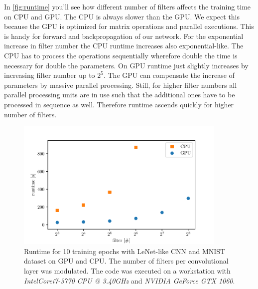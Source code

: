 \documentclass[a4paper,14pt]{article}
\begin{document}
In \autoref{fig:runtime} you'll see how different number of filters affects the
training time on CPU and GPU.
The CPU is always slower than the GPU.
We expect this because the GPU is optimized for matrix operations and parallel
executions. This is handy for forward and backpropagation of our network.
For the exponential increase in filter number the CPU runtime
increases also exponential-like.
The CPU has to process the operations sequentially wherefore double the time is necessary
for double the parameters.
On GPU runtime just slightly increases by increasing filter number up to $2^5$.
The GPU can compensate the increase of parameters by massive parallel
processing. Still, for higher filter numbers all parallel processing units are
in use such that the additional ones have to be processed in sequence as well.
Therefore runtime ascends quickly for higher number of filters.

\begin{figure}[ht]
  \centering \includegraphics[width=0.9\textwidth]{assets/runtime.pdf}
  \caption{
    \label{fig:runtime} Runtime for 10 training epochs with LeNet-like CNN and MNIST
    dataset on GPU and CPU.
    The number of filters per convolutional layer was modulated.
    The code was executed on a workstation
    with \emph{Intel\textregistered Core\texttrademark i7-3770 CPU @ 3.40GHz} and
    \emph{NVIDIA GeForce GTX 1060}.
  }
\end{figure}


\end{document}

